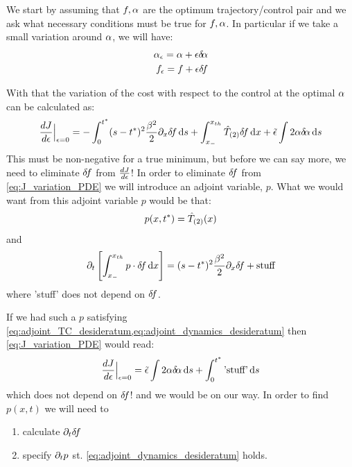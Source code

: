 \documentclass{article}
\begin{document}
We start by assuming that $f,{\alpha}$ are the optimum trajectory/control pair and we
ask what necessary conditions must be true for $f,{\alpha}$. In particular if we take
a small variation around ${\alpha}$, we will have:
\begin{align*}
{\alpha}_{\epsilon} = {\alpha} + {\epsilon} { \delta\! {\alpha}}
\\
f_{\epsilon} = f + {\epsilon} { \delta\! f}
\end{align*}

With that the variation of the cost with respect to the control at the optimal
${\alpha}$ can be calculated as:
\begin{equation}
\frac {dJ}{d{\epsilon}} \Big|_{{\epsilon} = 0} =
- \int_0^{ t^* } (s-{ t^* })^2 \frac {{\beta}^2}{2} {\partial}_x  { \delta\! f} \, \mathrm{d} s  
+ \int_{ x_{-} }^{ x_{th} } { \hat{T}_{(2)} }{ \delta\! f}\, \mathrm{d} x
+ \tilde{{\epsilon}} \int 2 {\alpha} { \delta\! {\alpha}} \, \mathrm{d} s  
\label{eq:J_variation_PDE}
\end{equation}
This must be non-negative for a true minimum, but before we can say more, we
need to eliminate ${ \delta\! f}$ from $\frac {dJ}{d{\epsilon}}$! In order to eliminate ${ \delta\! f}$
from \cref{eq:J_variation_PDE} we will introduce an adjoint variable, $p$. What
we would want from this adjoint variable $p$ would be that:
\begin{equation}
p(x,{ t^* }) = { \hat{T}_{(2)} }(x)
\label{eq:adjoint_TC_desideratum}
\end{equation}  
and 
\begin{equation}
{\partial}_t \left[ \int_{ x_{-} }^{ x_{th} }  p \cdot{ \delta\! f} \, \mathrm{d} x \right] = (s-{ t^* })^2 \frac
{{\beta}^2}{2}
{\partial}_x
{ \delta\! f}
 + \text{stuff}
\label{eq:adjoint_dynamics_desideratum}
\end{equation}
where 'stuff' does not depend on ${ \delta\! f}$.

If we had such a $p$ satisfying
\cref{eq:adjoint_TC_desideratum,eq:adjoint_dynamics_desideratum} then
\cref{eq:J_variation_PDE} would read:
\begin{equation}
\frac {dJ}{d{\epsilon}} \Big|_{{\epsilon} = 0} =
\tilde{{\epsilon}} \int 2 {\alpha}{ \delta\! {\alpha}}  \, \mathrm{d} s +   \int_0^{ t^* }  \text{'stuff'}\, \mathrm{d} s
\label{eq:J_variation_PDE_nodf}
\end{equation}
which does not depend on ${ \delta\! f}$! and we would be on our way. In order to find
$p(x,t)$ we will need to
\begin{enumerate}
  \item calculate ${\partial}_t { \delta\! f}$
  \item specify ${\partial}_t p $ st. \cref{eq:adjoint_dynamics_desideratum} holds.
\end{enumerate}
\end{document}
